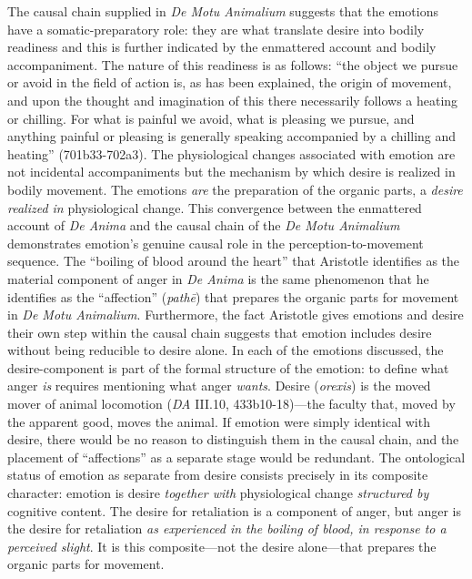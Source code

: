 \documentclass{article}
\begin{document}
The causal chain supplied in \textit{De Motu Animalium} suggests that the emotions have a somatic-preparatory role: they are what translate desire into bodily readiness and this is further indicated by the enmattered account and bodily accompaniment. The nature of this readiness is as follows: ``the object we pursue or avoid in the field of action is, as has been explained, the origin of movement, and upon the thought and imagination of this there necessarily follows a heating or chilling. For what is painful we avoid, what is pleasing we pursue, and anything painful or pleasing is generally speaking accompanied by a chilling and heating'' (701b33-702a3). The physiological changes associated with emotion are not incidental accompaniments but the mechanism by which desire is realized in bodily movement. The emotions \textit{are} the preparation of the organic parts, a \textit{desire realized in} physiological change. This convergence between the enmattered account of \textit{De Anima} and the causal chain of the \textit{De Motu Animalium} demonstrates emotion's genuine causal role in the perception-to-movement sequence. The ``boiling of blood around the heart'' that Aristotle identifies as the material component of anger in \textit{De Anima} is the same phenomenon that he identifies as the ``affection'' (\textit{pathē}) that prepares the organic parts for movement in \textit{De Motu Animalium}. Furthermore, the fact Aristotle gives emotions and desire their own step within the causal chain suggests that emotion includes desire without being reducible to desire alone. In each of the emotions discussed, the desire-component is part of the formal structure of the emotion: to define what anger \textit{is} requires mentioning what anger \textit{wants}. Desire (\textit{orexis}) is the moved mover of animal locomotion (\textit{DA} III.10, 433b10-18)---the faculty that, moved by the apparent good, moves the animal. If emotion were simply identical with desire, there would be no reason to distinguish them in the causal chain, and the placement of ``affections'' as a separate stage would be redundant. The ontological status of emotion as separate from desire consists precisely in its composite character: emotion is desire \textit{together with} physiological change \textit{structured by} cognitive content. The desire for retaliation is a component of anger, but anger is the desire for retaliation \textit{as experienced in the boiling of blood, in response to a perceived slight}. It is this composite---not the desire alone---that prepares the organic parts for movement. 
\end{document}
